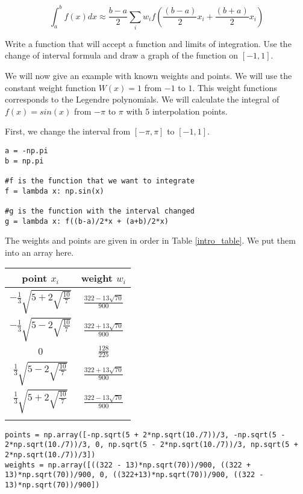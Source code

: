 \[
\int_a^b f(x) dx \approx \frac{b - a}{2} \sum_i w_if(\frac{(b-a)}{2}x_i + \frac{(b+a)}{2}x_i)
\]

\begin{problem}
Write a function that will accept a function and limits of integration.  Use the change of interval formula and draw a graph of the function on $[-1,1]$.
\end{problem}

We will now give an example with known weights and points.  We will use the constant weight function $W(x) = 1$ from $-1$ to $1$.  This weight functions corresponds to the Legendre polynomials.  We will calculate the integral of $f(x) = sin(x)$ from $-\pi$ to $\pi$ with $5$ interpolation points.

First, we change the interval from $[-\pi, \pi]$ to $[-1,1]$.

\begin{lstlisting}
a = -np.pi
b = np.pi

#f is the function that we want to integrate
f = lambda x: np.sin(x)

#g is the function with the interval changed
g = lambda x: f((b-a)/2*x + (a+b)/2*x)

\end{lstlisting}

The weights and points are given in order in Table \ref{intro_table}.  We put them into an array here.
\begin{center}
\begin{tabular}{|c|c|}
\hline
point $x_i$ & weight $w_i$ \\
\hline
$-\frac{1}{3}\sqrt{5 + 2\sqrt{\frac{10}{7}}}$ &  $\frac{322-13\sqrt{70}}{900}$ \\
\hline
$-\frac{1}{3}\sqrt{5 - 2\sqrt{\frac{10}{7}}}$ & $\frac{322+13\sqrt{70}}{900}$ \\
\hline
$0$ & $\frac{128}{225}$ \\
\hline
$\frac{1}{3}\sqrt{5 - 2\sqrt{\frac{10}{7}}}$ & $\frac{322+13\sqrt{70}}{900}$ \\
\hline
$\frac{1}{3}\sqrt{5 + 2\sqrt{\frac{10}{7}}}$ & $\frac{322-13\sqrt{70}}{900}$ \\
\hline
\label{intro_table}
\end{tabular}
\end{center}
\begin{lstlisting}
points = np.array([-np.sqrt(5 + 2*np.sqrt(10./7))/3, -np.sqrt(5 - 2*np.sqrt(10./7))/3, 0, np.sqrt(5 - 2*np.sqrt(10./7))/3, np.sqrt(5 + 2*np.sqrt(10./7))/3]) 
weights = np.array([((322 - 13)*np.sqrt(70))/900, ((322 + 13)*np.sqrt(70))/900, 0, ((322+13)*np.sqrt(70))/900, ((322 - 13)*np.sqrt(70))/900])
\end{lstlisting}

